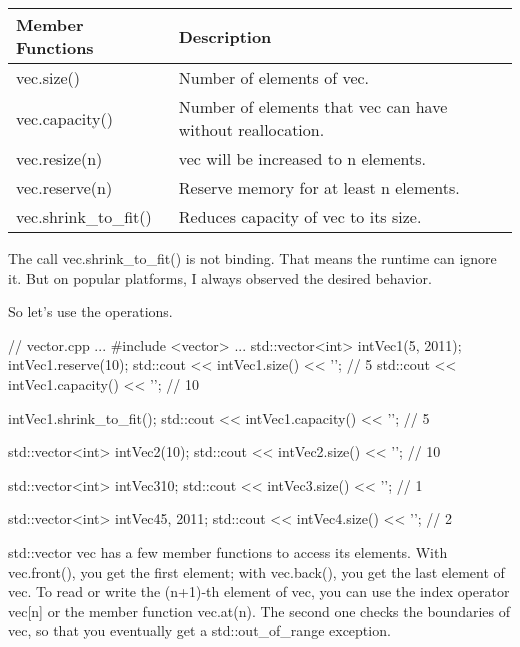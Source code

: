 \begin{longtable}[c]{|l|l|}
\hline
\textbf{Member Functions} & \textbf{Description}                                       \\ \hline
\endfirsthead
%
\endhead
%
vec.size()                & Number of elements of vec.                                 \\ \hline
vec.capacity()            & Number of elements that vec can have without reallocation. \\ \hline
vec.resize(n)             & vec will be increased to n elements.                       \\ \hline
vec.reserve(n)            & Reserve memory for at least n elements.                    \\ \hline
vec.shrink\_to\_fit()     & Reduces capacity of vec to its size.                       \\ \hline
\end{longtable}


The call vec.shrink\_to\_fit() is not binding. That means the runtime can ignore it. But on popular platforms, I always observed the desired behavior.

So let’s use the operations.


\begin{cpp}
// vector.cpp
...
#include <vector>
...
std::vector<int> intVec1(5, 2011);
intVec1.reserve(10);
std::cout << intVec1.size() << '\n'; // 5
std::cout << intVec1.capacity() << '\n'; // 10

intVec1.shrink_to_fit();
std::cout << intVec1.capacity() << '\n'; // 5

std::vector<int> intVec2(10);
std::cout << intVec2.size() << '\n'; // 10

std::vector<int> intVec3{10};
std::cout << intVec3.size() << '\n'; // 1

std::vector<int> intVec4{5, 2011};
std::cout << intVec4.size() << '\n'; // 2
\end{cpp}

std::vector vec has a few member functions to access its elements. With vec.front(), you get the first element; with vec.back(), you get the last element of vec. To read or write the (n+1)-th element of vec, you can use the index operator vec[n] or the member function vec.at(n). The second one checks the boundaries of vec, so that you eventually get a std::out\_of\_range exception.

